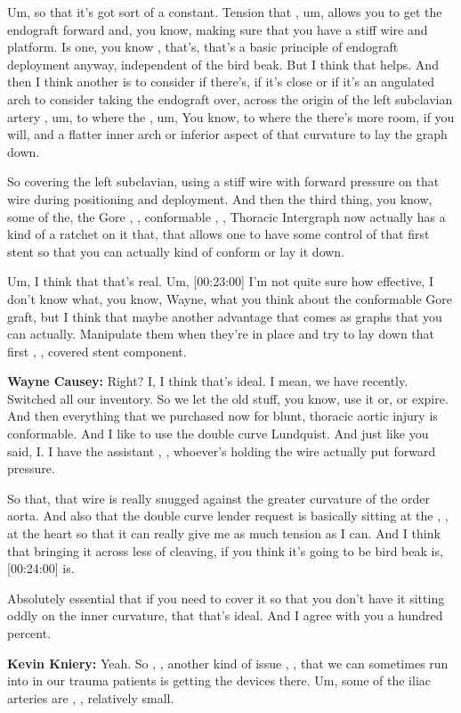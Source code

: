 \documentclass[
]{book}
\begin{document}
Um, so that it's got sort of a constant. Tension that , um, allows you
to get the endograft forward and, you know, making sure that you have a
stiff wire and platform. Is one, you know , that's, that's a basic
principle of endograft deployment anyway, independent of the bird beak.
But I think that helps. And then I think another is to consider if
there's, if it's close or if it's an angulated arch to consider taking
the endograft over, across the origin of the left subclavian artery ,
um, to where the , um, You know, to where the there's more room, if you
will, and a flatter inner arch or inferior aspect of that curvature to
lay the graph down.

So covering the left subclavian, using a stiff wire with forward
pressure on that wire during positioning and deployment. And then the
third thing, you know, some of the, the Gore , , conformable , ,
Thoracic Intergraph now actually has a kind of a ratchet on it that,
that allows one to have some control of that first stent so that you can
actually kind of conform or lay it down.

Um, I think that that's real. Um, {[}00:23:00{]} I'm not quite sure how
effective, I don't know what, you know, Wayne, what you think about the
conformable Gore graft, but I think that maybe another advantage that
comes as graphs that you can actually. Manipulate them when they're in
place and try to lay down that first , , covered stent component.

\textbf{Wayne Causey:} Right? I, I think that's ideal. I mean, we have
recently. Switched all our inventory. So we let the old stuff, you know,
use it or, or expire. And then everything that we purchased now for
blunt, thoracic aortic injury is conformable. And I like to use the
double curve Lundquist. And just like you said, I. I have the assistant
, , whoever's holding the wire actually put forward pressure.

So that, that wire is really snugged against the greater curvature of
the order aorta. And also that the double curve lender request is
basically sitting at the , , at the heart so that it can really give me
as much tension as I can. And I think that bringing it across less of
cleaving, if you think it's going to be bird beak is, {[}00:24:00{]} is.

Absolutely essential that if you need to cover it so that you don't have
it sitting oddly on the inner curvature, that that's ideal. And I agree
with you a hundred percent.

\textbf{Kevin Kniery:} Yeah. So , , another kind of issue , , that we can
sometimes run into in our trauma patients is getting the devices there.
Um, some of the iliac arteries are , , relatively small.
\end{document}
